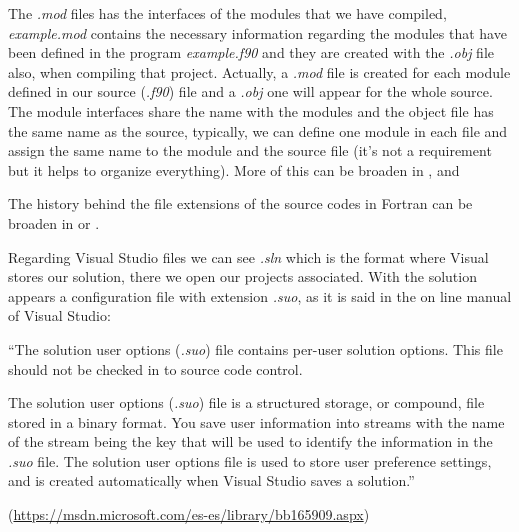 \begin{itemize}
    The \textit{.mod} files has the interfaces of the modules that we have compiled, \textit{example.mod} contains the necessary information regarding the modules that have been defined in the program \textit{example.f90} and they are created with the \textit{.obj} file also, when compiling that project. Actually, a \textit{.mod} file is created for each module defined in our source (\textit{.f90}) file and a \textit{.obj} one will appear for the whole source. The module interfaces share the name with the modules and the object file has the same name as the source, typically, we can define one module in each file and assign the same name to the module and the source file (it's not a requirement but it helps to organize everything). More of this can be broaden in \citep{mod1}, \citet{mod2} and \citep{mod3}
    
    The history behind the file extensions of the source codes in Fortran can be broaden in \citet{f90} or \citet{f902}.
    
    Regarding Visual Studio files we can see \textit{.sln} which is the format where Visual stores our solution, there we open our projects associated. With the solution appears a configuration file with extension \textit{.suo}, as it is said in the on line manual of Visual Studio: 
    
    \begin{center}
        \begin{minipage}{0.7\linewidth}
            \vspace{5pt}        
            {\small
                ``The solution user options (\textit{.suo}) file contains per-user solution options. This file should not be checked in to source code control.
                
                The solution user options (\textit{.suo}) file is a structured storage, or compound, file stored in a binary format. You save user information into streams with the name of the stream being the key that will be used to identify the information in the \textit{.suo} file. The solution user options file is used to store user preference settings, and is created automatically when Visual Studio saves a solution.''
            }
            \begin{flushright}
                (\url {https://msdn.microsoft.com/es-es/library/bb165909.aspx})
            \end{flushright}
            \vspace{5pt} 
        \end{minipage}
    \end{center}
    

\end{itemize}
